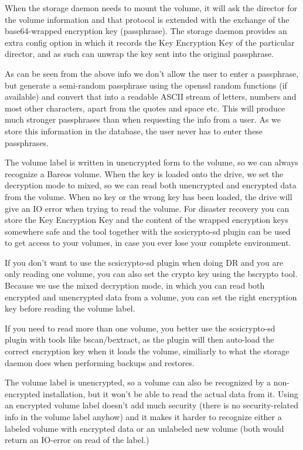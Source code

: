 When the storage daemon needs to mount the volume, it will ask the director for the volume information and that protocol is extended with the exchange of the base64-wrapped encryption key (passphrase). The storage daemon provides an extra config option in which it records the Key Encryption Key of the particular director, and as such can unwrap the key sent into the original passphrase.

As can be seen from the above info we don't allow the user to enter a passphrase, but generate a semi-random passphrase using the openssl random functions (if available) and convert that into a readable ASCII stream of letters, numbers and most other characters, apart from the quotes and space etc. This will produce much stronger passphrases than when requesting the info from a user. As we store this information in the database, the user never has to enter these passphrases.

The volume label is written in unencrypted form to the volume, so we can always recognize a Bareos volume. When the key is loaded onto the drive, we set the decryption mode to mixed, so we can read both unencrypted and encrypted data from the volume. When no key or the wrong key has been loaded, the drive will give an IO error when trying to read the volume.
For disaster recovery you can store the Key Encryption Key and the content of the wrapped encryption keys somewhere safe and the  tool together with the scsicrypto-sd plugin can be used to get access to your volumes, in case you ever lose your complete environment.

If you don't want to use the scsicrypto-sd plugin when doing DR and you are only reading one volume, you can also set the crypto key using the bscrypto tool. Because we use the mixed decryption mode, in which you can read both encrypted and unencrypted data from a volume, you can set the right encryption key before reading the volume label.

If you need to read more than one volume, you better use the scsicrypto-sd plugin with tools like bscan/bextract, as the plugin will then auto-load the correct encryption key when it loads the volume, similiarly to what the storage daemon does when performing backups and restores.

The volume label is unencrypted, so a volume can also be recognized by a non-encrypted installation, but it won't be able to read the actual data from it. Using an encrypted volume label doesn't add much security (there is no security-related info in the volume label anyhow) and it makes it harder to recognize either a labeled volume with encrypted data or an unlabeled new volume (both would return an IO-error on read of the label.)

